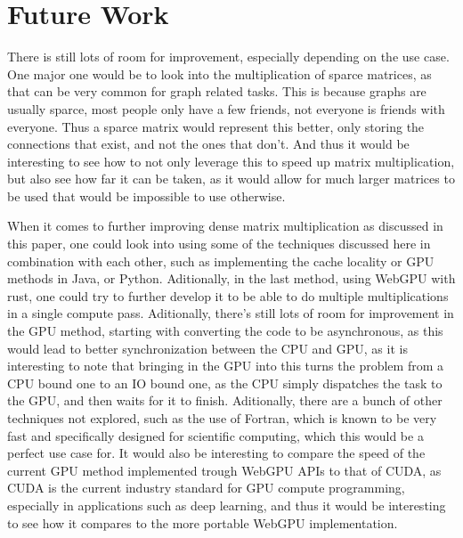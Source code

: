 \documentclass{article}
\begin{document}
\section{Future Work}

There is still lots of room for improvement, especially depending on the use case.
One major one would be to look into the multiplication of sparce matrices,
as that can be very common for graph related tasks.
This is because graphs are usually sparce, most people only have a few friends, not everyone is friends with everyone.
Thus a sparce matrix would represent this better, only storing the connections that exist, and not the ones that don't.
And thus it would be interesting to see how to not only leverage this to speed up matrix multiplication,
but also see how far it can be taken, as it would allow for much larger matrices to be used that would be impossible to use otherwise.

When it comes to further improving dense matrix multiplication as discussed in this paper,
one could look into using some of the techniques discussed here in combination with each other,
such as implementing the cache locality or GPU methods in Java, or Python.
Aditionally, in the last method, using WebGPU with rust,
one could try to further develop it to be able to do multiple multiplications in a single compute pass.
Aditionally, there's still lots of room for improvement in the GPU method, starting with converting
the code to be asynchronous, as this would lead to better synchronization between the CPU and GPU,
as it is interesting to note that bringing in the GPU into this
turns the problem from a CPU bound one to an IO bound one,
as the CPU simply dispatches the task to the GPU, and then waits for it to finish.
Aditionally, there are a bunch of other techniques not explored,
such as the use of Fortran, which is known to be very fast and specifically
designed for scientific computing, which this would be a perfect use case for.
It would also be interesting to compare the speed of the current GPU
method implemented trough WebGPU APIs to that of CUDA, as CUDA is 
the current industry standard for GPU compute programming, especially 
in applications such as deep learning, and thus it would be interesting
to see how it compares to the more portable WebGPU implementation.
\end{document}
